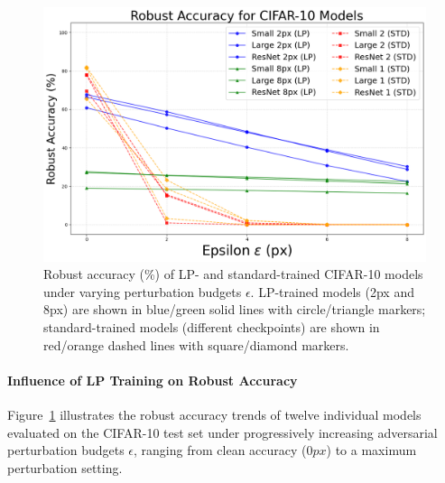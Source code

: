 \begin{figure}[htbp]
    \centering
    \includegraphics[width=0.85\linewidth]{images/Single model performance.png}
    \caption{Robust accuracy (\%) of LP- and standard-trained CIFAR-10 models under varying perturbation budgets $\epsilon$. LP-trained models (2px and 8px) are shown in blue/green solid lines with circle/triangle markers; standard-trained models (different checkpoints) are shown in red/orange dashed lines with square/diamond markers.}
\label{fig:robust_accuracy}

\end{figure}

\paragraph{Influence of LP Training on Robust Accuracy}  
Figure~\ref{fig:robust_accuracy} illustrates the robust accuracy trends of twelve individual models evaluated on the CIFAR-10 test set under progressively increasing adversarial perturbation budgets $\epsilon$, ranging from clean accuracy ($0px$) to a maximum perturbation setting.

